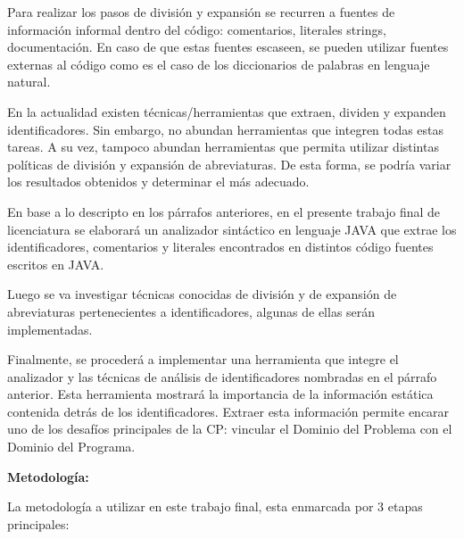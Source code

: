 \documentclass[a4paper,12pt]{report}
\begin{document}
\hspace{0.5cm}Para realizar los pasos de división y expansión se recurren a fuentes de información informal dentro del código: comentarios, literales strings, documentación. En caso de que estas fuentes escaseen, se pueden utilizar fuentes externas al código como es el caso de los diccionarios de palabras en lenguaje natural.

\hspace{0.5cm}En la actualidad existen técnicas/herramientas que extraen, dividen y expanden identificadores. Sin embargo, no abundan herramientas que integren todas estas tareas. A su vez, tampoco abundan herramientas que permita utilizar distintas políticas de división y expansión de abreviaturas. De esta forma, se podría variar los resultados obtenidos y determinar el más adecuado.

\hspace{0.5cm}En base a lo descripto en los párrafos anteriores, en el presente trabajo final de licenciatura se elaborará un analizador sintáctico en lenguaje JAVA que extrae los identificadores, comentarios y literales encontrados en distintos código fuentes escritos en JAVA.

\hspace{0.5cm}Luego se va investigar técnicas conocidas de división y de expansión de abreviaturas pertenecientes a identificadores, algunas de ellas serán implementadas. 

\hspace{0.5cm}Finalmente, se procederá a implementar una herramienta que integre el analizador y las técnicas de análisis de identificadores nombradas en el párrafo anterior. Esta herramienta mostrará la importancia de la información estática contenida detrás de los identificadores. Extraer esta información permite encarar uno de los desafíos principales de la CP: vincular el Dominio del Problema con el Dominio del Programa.
\vskip0.5cm


{\large \textbf{Metodología:}}
\vskip0.5cm

\hspace{0.5cm}La metodología a utilizar en este trabajo final, esta enmarcada por 3 etapas principales:
\end{document}
